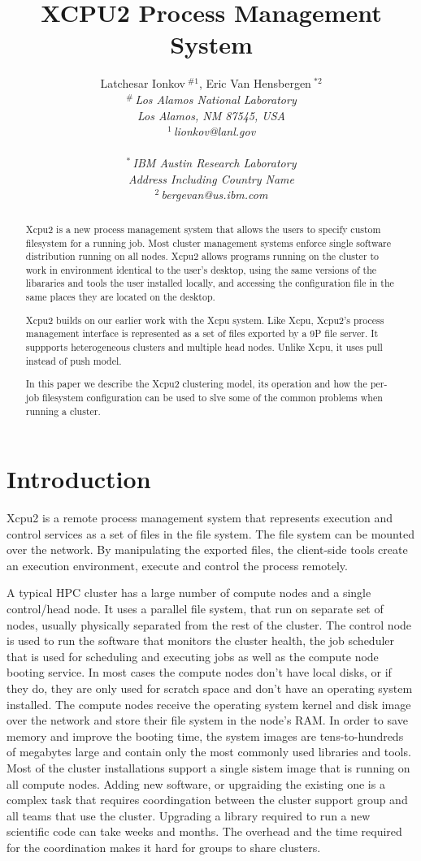 \documentclass[10pt,conference,letterpaper]{IEEEtran}
\title{XCPU2 Process Management System}
\author{%
{Latchesar Ionkov{\small $~^{\#1}$}, Eric Van Hensbergen{\small $~^{*2}$} }%
\vspace{1.6mm}\\
\fontsize{10}{10}\selectfont\itshape
$^{\#}$\,Los Alamos National Laboratory\\
Los Alamos, NM 87545, USA\\
\fontsize{9}{9}\selectfont\ttfamily\upshape
$^{1}$\,lionkov@lanl.gov\\
\vspace{1.2mm}\\
\fontsize{10}{10}\selectfont\rmfamily\itshape
$^{*}$\,IBM Austin Research Laboratory\\
Address Including Country Name\\
\fontsize{9}{9}\selectfont\ttfamily\upshape
$^{2}$\,bergevan@us.ibm.com
}
\begin{document}
\maketitle
%
\begin{abstract}

Xcpu2 is a new process management system that allows the users to
specify custom filesystem for a running job. Most cluster management
systems enforce single software distribution running on all nodes.
Xcpu2 allows programs running on the cluster to work in environment
identical to the user's desktop, using the same versions of the
libararies and tools the user installed locally, and accessing the
configuration file in the same places they are located on the desktop.

Xcpu2 builds on our earlier work with the Xcpu system. Like Xcpu,
Xcpu2's process management interface is represented as a set of files
exported by a 9P file server. It suppports heterogeneous clusters and
multiple head nodes. Unlike Xcpu, it uses pull instead of push model.

In this paper we describe the Xcpu2 clustering model, its operation
and how the per-job filesystem configuration can be used to slve some
of the common problems when running a cluster.

\end{abstract}

\section{Introduction}

Xcpu2 is a remote process management system that represents execution and
control services as a set of files in the file system. The file system can
be mounted over the network. By manipulating the exported files, the
client-side tools create an execution environment, execute and control the
process remotely.

A typical HPC cluster has a large number of compute nodes and a single
control/head node. It uses a parallel file system, that run on separate set
of nodes, usually physically separated from the rest of the cluster. The
control node is used to run the software that monitors the cluster health,
the job scheduler that is used for scheduling and executing jobs as well as
the compute node booting service. In most cases the compute nodes don't have
local disks, or if they do, they are only used for scratch space and don't
have an operating system installed. The compute nodes receive the operating
system kernel and disk image over the network and store their file system in
the node's RAM. In order to save memory and improve the booting time, the
system images are tens-to-hundreds of megabytes large and contain only the
most commonly used libraries and tools. Most of the cluster installations
support a single sistem image that is running on all compute nodes. Adding
new software, or upgraiding the existing one is a complex task that requires
coordingation between the cluster support group and all teams that use the
cluster. Upgrading a library required to run a new scientific code can take
weeks and months. The overhead and the time required for the coordination
makes it hard for groups to share clusters.
\end{document}

